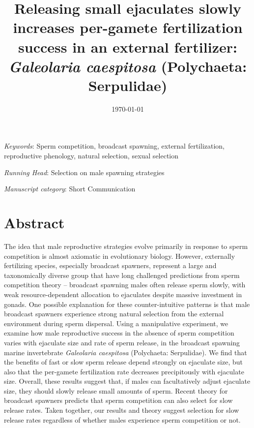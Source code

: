 \documentclass{article}
\title{Releasing small ejaculates slowly increases per-gamete fertilization success in an external fertilizer: \textit{Galeolaria caespitosa} (Polychaeta: Serpulidae)}
\date{\today}
\begin{document}
\maketitle




\noindent{} \textit{Keywords}: Sperm competition, broadcast spawning, external fertilization, reproductive phenology, natural selection, sexual selection
\bigskip

\noindent{} \textit{Running Head}: Selection on male spawning strategies

\bigskip

\noindent{} \textit{Manuscript category}: Short Communication

\bigskip


\linenumbers
\modulolinenumbers[1]
\renewcommand\linenumberfont{\normalfont\small}
\newpage{}



\section{Abstract}

\noindent{} The idea that male reproductive strategies evolve primarily in response to sperm competition is almost axiomatic in evolutionary biology. However, externally fertilizing species, especially broadcast spawners, represent a large and taxonomically diverse group that have long challenged predictions from sperm competition theory -- broadcast spawning males often release sperm slowly, with weak resource-dependent allocation to ejaculates despite massive investment in gonads. One possible explanation for these counter-intuitive patterns is that male broadcast spawners experience strong natural selection from the external environment during sperm dispersal. Using a manipulative experiment, we examine how male reproductive success in the absence of sperm competition varies with ejaculate size and rate of sperm release, in the broadcast spawning marine invertebrate \textit{Galeolaria caespitosa} (Polychaeta: Serpulidae). We find that the benefits of fast or slow sperm release depend strongly on ejaculate size, but also that the per-gamete fertilization rate decreases precipitously with ejaculate size. Overall, these results suggest that, if males can facultatively adjust ejaculate size, they should slowly release small amounts of sperm. Recent theory for broadcast spawners predicts that sperm competition can also select for slow release rates. Taken together, our results and theory suggest selection for slow release rates regardless of whether males experience sperm competition or not.
\end{document}
